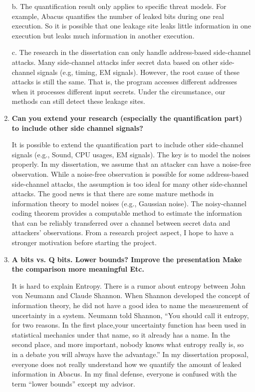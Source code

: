 \documentclass{article}
\begin{document}
\begin{enumerate}
b. The quantification result only applies to specific threat models. For example, Abacus quantifies the number of leaked bits during one real execution. So it is possible that one leakage site leaks little information in one execution but leaks much information in another execution.

c. The research in the dissertation can only handle address-based side-channel attacks. Many side-channel attacks infer secret data based on other side-channel signals (e.g, timing, EM signals). However, the root cause of these attacks is still the same. That is, the program accesses different addresses when it processes different input secrets. Under the circumstance, our methods can still detect these leakage sites.

\item \textbf{Can you extend your research (especially the quantification part) to include other side channel signals?}

It is possible to extend the quantification part to include other side-channel signals (e.g., Sound, CPU usages, EM signals). The key is to model the noises properly. In my dissertation, we assume that an attacker can have a noise-free observation. While a noise-free observation is possible for some address-based side-channel attacks, the assumption is too ideal for many other side-channel attacks. The good news is that there are some mature methods in information theory to model noises (e.g., Gaussian noise). The noisy-channel coding theorem provides a computable method to estimate the information that can be reliably transferred over a channel between secret data and attackers' observations. From a research project aspect, I hope to have a stronger motivation before starting the project. 
\item \textbf{A bits vs. Q bits. Lower bounds?
       Improve the presentation
       Make the comparison more meaningful
       Etc.}

It is hard to explain Entropy. There is a rumor about entropy between John von Neumann and Claude Shannon. When Shannon developed the concept of information theory, he did not have a good idea to name the measurement of uncertainty in a system. Neumann told Shannon, ``You should call it entropy, for two reasons. In the first place,your uncertainty function has been used in statistical mechanics under that name, so it already has a name. In the second place, and more important, nobody knows what entropy really is, so in a debate you will always have the advantage.'' In my dissertation proposal, everyone does not really understand how we quantify the amount of leaked information in Abacus. In my final defense, everyone is confused with the term ``lower bounds'' except my advisor. 


\end{enumerate}
\end{document}
